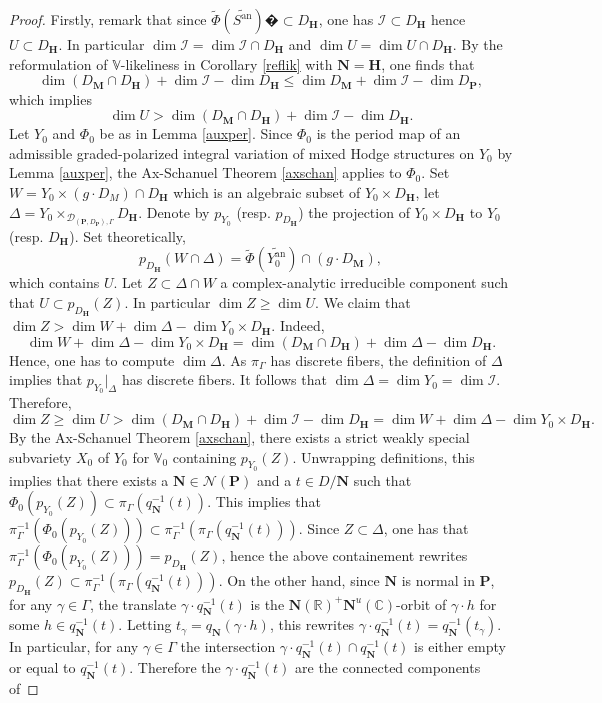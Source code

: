 \documentclass[10pt]{article}
\numberwithin{equation}{subsection}
\theoremstyle{plain}
\theoremstyle{definition}
\theoremstyle{remark}
\newcommand{\I}{\mathscr{I}}
\newcommand{\C}{\mathbb C}
\newcommand{\R}{\mathbb R}
\newcommand{\V}{\mathbb V}
\newcommand{\pp}{\mathbf P}
\newcommand{\mon}{\mathbf H}
\newcommand{\M}{\mathbf M}
\newcommand{\NN}{\mathbf N}
\newcommand{\an}{\mathrm{an}}
\newcommand{\period}{\mathscr{D}}
\newcommand{\Np}{\mathcal{N}(\pp)}
\begin{document}
\begin{proof}
Firstly, remark that since $\tilde{\Phi}(\widetilde{S^\an})�\subset D_{\mon}$, one has $\I \subset D_{\mon}$ hence $U \subset D_{\mon}$. In particular $\dim \I = \dim \I \cap D_{\mon}$ and $\dim U = \dim U \cap D_{\mon}$. By the reformulation of $\V$-likeliness in Corollary \ref{reflik} with $\NN = \mon$, one finds that
\[
\dim (D_\M \cap D_{\mon}) + \dim \I - \dim D_{\mon} \leqslant \dim D_\M + \dim \I - \dim D_\pp,
\]
which implies
\[
\dim U > \dim (D_\M \cap D_{\mon}) + \dim \I - \dim D_{\mon}.
\]
Let $Y_0$ and $\Phi_0$ be as in Lemma \ref{auxper}. Since $\Phi_0$ is the period map of an admissible graded-polarized integral variation of mixed Hodge structures on $Y_0$ by Lemma \ref{auxper}, the Ax-Schanuel Theorem \ref{axschan} applies to $\Phi_0$. Set $W = Y_0 \times (g \cdot D_M) \cap D_{\mon}$ which is an algebraic subset of $Y_0 \times D_{\mon}$, let $\Delta = Y_0 \times_{\period_{(\pp, D_\pp), \Gamma}} D_{\mon}$. Denote by $p_{Y_0}$ (resp. $p_{D_{\mon}}$) the projection of $Y_0 \times D_{\mon}$ to $Y_0$ (resp. $D_{\mon}$). Set theoretically,
\[
p_{D_{\mon}}(W \cap \Delta) = \tilde{\Phi}(\widetilde{Y_0^\an}) \cap (g \cdot D_\M),
\]
which contains $U$. Let $Z \subset \Delta \cap W$ a complex-analytic irreducible component such that $U \subset p_{D_{\mon}}(Z)$. In particular $\dim Z \geqslant \dim U$. We claim that $\dim Z > \dim W + \dim \Delta - \dim Y_0 \times D_{\mon}$. Indeed,
\[
\dim W + \dim \Delta - \dim Y_0 \times D_{\mon} = \dim (D_\M \cap D_{\mon}) + \dim \Delta - \dim D_{\mon}.
\]
Hence, one has to compute $\dim \Delta$. As $\pi_\Gamma$ has discrete fibers, the definition of $\Delta$ implies that $p_{Y_0}\vert_{\Delta}$ has discrete fibers. It follows that $\dim \Delta = \dim Y_0 = \dim \I$. Therefore,
\[
\dim Z \geqslant \dim U > \dim (D_\M \cap D_{\mon}) + \dim \I - \dim D_{\mon} = \dim W + \dim \Delta - \dim Y_0 \times D_{\mon}.
\]
By the Ax-Schanuel Theorem \ref{axschan}, there exists a strict weakly special subvariety $X_0$ of $Y_0$ for $\V_0$ containing $p_{Y_0}(Z)$. Unwrapping definitions, this implies that there exists a $\NN \in \Np$ and a $t \in D/\NN$ such that $\Phi_0(p_{Y_0}(Z)) \subset \pi_\Gamma(q_\NN^{-1}(t))$. This implies that $\pi_\Gamma^{-1}(\Phi_0(p_{Y_0}(Z))) \subset \pi_\Gamma^{-1}(\pi_\Gamma(q_\NN^{-1}(t)))$. Since $Z \subset \Delta$, one has that $\pi_\Gamma^{-1}(\Phi_0(p_{Y_0}(Z))) = p_{D_{\mon}}(Z)$, hence the above containement rewrites $p_{D_{\mon}}(Z) \subset \pi_\Gamma^{-1}(\pi_\Gamma(q_\NN^{-1}(t)))$. On the other hand, since $\NN$ is normal in $\pp$, for any $\gamma \in \Gamma$, the translate $\gamma \cdot q_\NN^{-1}(t)$ is the $\NN(\R)^+\NN^u(\C)$-orbit of $\gamma \cdot h$ for some $h \in q_\NN^{-1}(t)$. Letting $t_\gamma = q_\NN(\gamma \cdot h)$, this rewrites $\gamma \cdot q_\NN^{-1}(t) = q_\NN^{-1}(t_\gamma)$. In particular, for any $\gamma \in \Gamma$ the intersection $\gamma \cdot q_\NN^{-1}(t) \cap q_\NN^{-1}(t)$ is either empty or equal to $q_\NN^{-1}(t)$. Therefore the $\gamma \cdot q_\NN^{-1}(t)$ are the connected components of

\end{proof}
\end{document}
